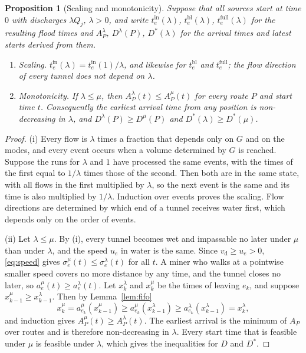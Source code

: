 \documentclass[11pt,a4paper]{article}
\theoremstyle{plain}
\newtheorem{proposition}{Proposition}
\theoremstyle{definition}
\theoremstyle{remark}
\newcommand{\tin}{t^{\mathrm{in}}}
\newcommand{\tbl}{t^{\mathrm{bl}}}
\newcommand{\tfull}{t^{\mathrm{full}}}
\newcommand{\vd}{v_{\mathrm{d}}}
\begin{document}
\begin{proposition}[Scaling and monotonicity]\label{prop:inflow}
Suppose that all sources start at time $0$ with discharges $\lambda Q_j$, $\lambda > 0$, and write $\tin_e(\lambda)$, $\tbl_e(\lambda)$, $\tfull_e(\lambda)$ for the resulting flood times and $A_P^\lambda$, $D^\lambda(P)$, $D^*(\lambda)$ for the arrival times and latest starts derived from them.
\begin{enumerate}[label=(\roman*), leftmargin=2em, itemsep=1pt, topsep=2pt]
  \item \emph{Scaling.} $\tin_e(\lambda) = \tin_e(1)/\lambda$, and likewise for $\tbl_e$ and $\tfull_e$; the flow direction of every tunnel does not depend on $\lambda$.
  \item \emph{Monotonicity.} If $\lambda \le \mu$, then $A_P^\lambda(t) \le A_P^\mu(t)$ for every route $P$ and start time $t$. Consequently the earliest arrival time from any position is non-decreasing in $\lambda$, and $D^\lambda(P) \ge D^\mu(P)$ and $D^*(\lambda) \ge D^*(\mu)$.
\end{enumerate}
\end{proposition}
\begin{proof}
(i) Every flow is $\lambda$ times a fraction that depends only on $G$ and on the modes, and every event occurs when a volume determined by $G$ is reached. Suppose the runs for $\lambda$ and $1$ have processed the same events, with the times of the first equal to $1/\lambda$ times those of the second. Then both are in the same state, with all flows in the first multiplied by $\lambda$, so the next event is the same and its time is also multiplied by $1/\lambda$. Induction over events proves the scaling. Flow directions are determined by which end of a tunnel receives water first, which depends only on the order of events.

(ii) Let $\lambda \le \mu$. By (i), every tunnel becomes wet and impassable no later under $\mu$ than under $\lambda$, and the speed $u_e$ in water is the same. Since $\vd \ge u_e > 0$, \eqref{eq:speed} gives $\sigma_e^\mu(t) \le \sigma_e^\lambda(t)$ for all $t$. A miner who walks at a pointwise smaller speed covers no more distance by any time, and the tunnel closes no later, so $a_e^\mu(t) \ge a_e^\lambda(t)$. Let $x_k^\lambda$ and $x_k^\mu$ be the times of leaving $e_k$, and suppose $x_{k-1}^\mu \ge x_{k-1}^\lambda$. Then by Lemma~\ref{lem:fifo}
\[
  x_k^\mu = a_{e_k}^\mu(x_{k-1}^\mu) \ge a_{e_k}^\mu(x_{k-1}^\lambda) \ge a_{e_k}^\lambda(x_{k-1}^\lambda) = x_k^\lambda,
\]
and induction gives $A_P^\mu(t) \ge A_P^\lambda(t)$. The earliest arrival is the minimum of $A_P$ over routes and is therefore non-decreasing in $\lambda$. Every start time that is feasible under $\mu$ is feasible under $\lambda$, which gives the inequalities for $D$ and $D^*$.
\end{proof}
\end{document}
